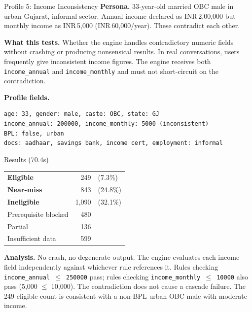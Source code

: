 \documentclass[11pt,a4paper]{article}
\newcommand{\rupee}{INR\,}
\newcommand{\ic}[1]{\texttt{\color{accent}#1}}
\begin{document}
\begin{profilebox}{Profile 5: Income Inconsistency}
\textbf{Persona.} 33-year-old married OBC male in urban Gujarat, informal sector. Annual income declared as \rupee 2{,}00{,}000 but monthly income as \rupee 5{,}000 (\rupee 60{,}000/year). These contradict each other.

\textbf{What this tests.} Whether the engine handles contradictory numeric fields without crashing or producing nonsensical results. In real conversations, users frequently give inconsistent income figures. The engine receives both \ic{income\_annual} and \ic{income\_monthly} and must not short-circuit on the contradiction.

\textbf{Profile fields.}
\begin{lstlisting}[nolol]
age: 33, gender: male, caste: OBC, state: GJ
income_annual: 200000, income_monthly: 5000 (inconsistent)
BPL: false, urban
docs: aadhaar, savings bank, income cert, employment: informal
\end{lstlisting}

\begin{resultbox}{Results (70.4s)}
\begin{tabular}{@{}lrl@{}}
  \textcolor{eligible}{\textbf{Eligible}} & 249 & (7.3\%) \\
  \textcolor{nearmiss}{\textbf{Near-miss}} & 843 & (24.8\%) \\
  \textcolor{inelig}{\textbf{Ineligible}} & 1{,}090 & (32.1\%) \\
  Prerequisite blocked & 480 & \\
  Partial & 136 & \\
  Insufficient data & 599 & \\
\end{tabular}
\end{resultbox}

\textbf{Analysis.} No crash, no degenerate output. The engine evaluates each income field independently against whichever rule references it. Rules checking \ic{income\_annual $\leq$ 250000} pass; rules checking \ic{income\_monthly $\leq$ 10000} also pass (5{,}000 $\leq$ 10{,}000). The contradiction does not cause a cascade failure. The 249 eligible count is consistent with a non-BPL urban OBC male with moderate income.
\end{profilebox}
\end{document}
